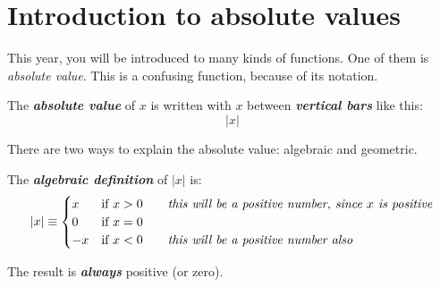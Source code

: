 

\section*{Introduction to absolute values}

This year, you will be introduced to many kinds of functions.
One of them is \emph{absolute value}.
This is a confusing function, because of its notation.

\begin{center}
    \begin{tcolorbox}[width=3.5in]
        The {\bfseries\itshape absolute value} of $x$ is written with $x$ 
        between {\bfseries\itshape vertical bars} like this:
        \[   |x|   \]
    \end{tcolorbox}
\end{center}

There are two ways to explain the absolute value: algebraic and geometric.

\begin{center}
    \begin{tcolorbox}[width=5in]
    The {\bfseries\itshape algebraic definition} of $|x|$ is:
    \[ 
        |x| \equiv
        \begin{cases} 
            x &  \text{if } x>0 \qquad\text{\itshape this will be a positive number, since $x$ is positive}\\
            0 &  \text{if } x=0 \\
            -x & \text{if } x<0 \qquad\text{\itshape this will be a positive number also}
        \end{cases}
    \]
    
    The result is {\bfseries\itshape always} positive (or zero).
    \end{tcolorbox}
    \end{center}

